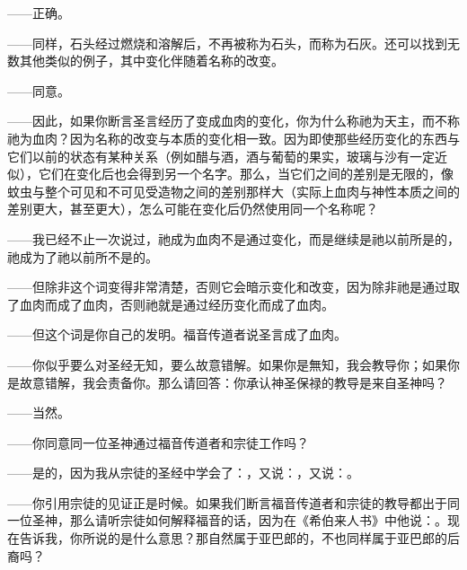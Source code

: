——正确。\par

——同样，石头经过燃烧和溶解后，不再被称为石头，而称为石灰。还可以找到无数其他类似的例子，其中变化伴随着名称的改变。\par

——同意。\par

——因此，如果你断言圣言经历了变成血肉的变化，你为什么称祂为天主，而不称祂为血肉？因为名称的改变与本质的变化相一致。因为即使那些经历变化的东西与它们以前的状态有某种关系（例如醋与酒，酒与葡萄的果实，玻璃与沙有一定近似），它们在变化后也会得到另一个名字。那么，当它们之间的差别是无限的，像蚊虫与整个可见和不可见受造物之间的差别那样大（实际上血肉与神性本质之间的差别更大，甚至更大），怎么可能在变化后仍然使用同一个名称呢？\par

——我已经不止一次说过，祂成为血肉不是通过变化，而是继续是祂以前所是的，祂成为了祂以前所不是的。\par

——但除非这个词变得非常清楚，否则它会暗示变化和改变，因为除非祂是通过取了血肉而成了血肉，否则祂就是通过经历变化而成了血肉。\par

——但这个词是你自己的发明。福音传道者说圣言成了血肉。\par

——你似乎要么对圣经无知，要么故意错解。如果你是無知，我会教导你；如果你是故意错解，我会责备你。那么请回答：你承认神圣保禄的教导是来自圣神吗？\par

——当然。\par

——你同意同一位圣神通过福音传道者和宗徒工作吗？\par

——是的，因为我从宗徒的圣经中学会了：，又说：，又说：。\par

——你引用宗徒的见证正是时候。如果我们断言福音传道者和宗徒的教导都出于同一位圣神，那么请听宗徒如何解释福音的话，因为在《希伯来人书》中他说：。现在告诉我，你所说的是什么意思？那自然属于亚巴郎的，不也同样属于亚巴郎的后裔吗？\par


